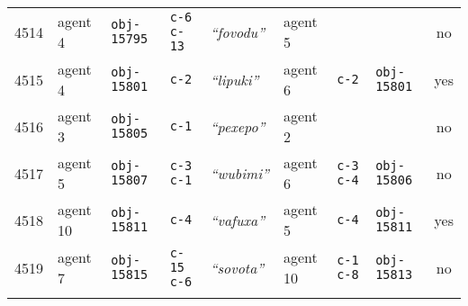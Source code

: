 {{\begin{tabular}{llllllllc}
4514 & agent 4 & \texttt{obj-15795} & \texttt{c-6 c-13} & \textit{``fovodu''} & agent 5 & \texttt{} &  & no \\
4515 & agent 4 & \texttt{obj-15801} & \texttt{c-2} & \textit{``lipuki''} & agent 6 & \texttt{c-2} & \texttt{obj-15801} & yes \\
4516 & agent 3 & \texttt{obj-15805} & \texttt{c-1} & \textit{``pexepo''} & agent 2 & \texttt{} &  & no \\
4517 & agent 5 & \texttt{obj-15807} & \texttt{c-3 c-1} & \textit{``wubimi''} & agent 6 & \texttt{c-3 c-4} & \texttt{obj-15806} & no \\
4518 & agent 10 & \texttt{obj-15811} & \texttt{c-4} & \textit{``vafuxa''} & agent 5 & \texttt{c-4} & \texttt{obj-15811} & yes \\
4519 & agent 7 & \texttt{obj-15815} & \texttt{c-15 c-6} & \textit{``sovota''} & agent 10 & \texttt{c-1 c-8} & \texttt{obj-15813} & no \\
 \\\end{tabular}}}


